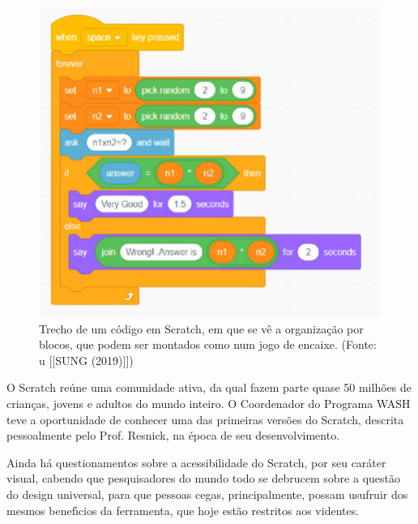 \documentclass[
12pt,		%
openright,	%
twoside,  %
a4paper,			%
chapter=TITLE,		%
english,			%
french,				%
spanish,			%
brazil				%
]{USPSC-classe/USPSC}
\begin{document}
\captionsetup{format=plain}
\begin{figure}[max size={\textwidth}{\textheight}]

\centering


\begin{minipage}[b]{0.4\linewidth}
        \centering
                \includegraphics[width=1.0\linewidth]{../../imagens/Scratch-Block.png}
                \caption{Trecho de um c\'odigo em Scratch, em que se v\^e a organiza\c{c}\~ao por blocos, que podem ser montados como num jogo de encaixe. (Fonte: u [[SUNG (2019)]])}
                \label{5cac9c9edeb34a88b5571069bb494cda1ce1bd9c}
\end{minipage}%
\hspace{0.5cm}
\end{figure}



O Scratch re\'une uma comunidade ativa, da qual fazem parte quase 50 milh\~oes de crian\c{c}as, jovens e adultos do mundo inteiro. O Coordenador do Programa WASH teve a oportunidade de conhecer uma das primeiras vers\~oes do Scratch, descrita pessoalmente pelo Prof. Resnick, na \'epoca de seu desenvolvimento.




Ainda h\'a questionamentos sobre a acessibilidade do Scratch, por seu car\'ater visual, cabendo que pesquisadores do mundo todo se debrucem sobre a quest\~ao do design universal, para que pessoas cegas, principalmente, possam usufruir dos mesmos benef\'{\i}cios da ferramenta, que hoje est\~ao restritos aos videntes.
\end{document}
